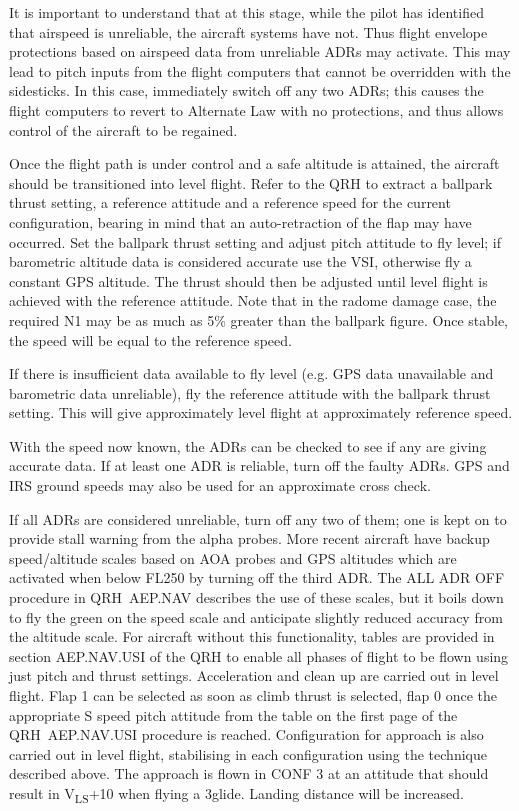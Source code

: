 \documentclass[a5paper,11pt,twoside]{book}
\newcommand{\V}[1]{V\textsubscript{#1}}
\begin{document}
It is important to understand that at this stage, while the pilot has identified
that airspeed is unreliable, the aircraft systems have not. Thus flight envelope
protections based on airspeed data from unreliable ADRs may activate. This may
lead to pitch inputs from the flight computers that cannot be overridden with
the sidesticks. In this case, immediately switch off any two ADRs; this causes
the flight computers to revert to Alternate Law with no protections, and thus
allows control of the aircraft to be regained.

Once the flight path is under control and a safe altitude is attained, the
aircraft should be transitioned into level flight. Refer to the QRH to
extract a ballpark thrust setting, a reference attitude and a reference speed
for the current configuration, bearing in mind that an auto-retraction of the
flap may have occurred. Set the ballpark thrust setting and adjust pitch
attitude to fly level; if barometric altitude data is considered accurate use
the VSI, otherwise fly a constant GPS altitude. The thrust should then be
adjusted until level flight is achieved with the reference attitude. Note that
in the radome damage case, the required N1 may be as much as 5\% greater than
the ballpark figure. Once stable, the speed will be equal to the reference
speed.

If there is insufficient data available to fly level (e.g. GPS data unavailable
and barometric data unreliable), fly the reference attitude with the ballpark
thrust setting. This will give approximately level flight at approximately
reference speed.

With the speed now known, the ADRs can be checked to see if any are giving
accurate data. If at least one ADR is reliable, turn off the faulty ADRs. GPS
and IRS ground speeds may also be used for an approximate cross check.

If all ADRs are considered unreliable, turn off any two of them; one is kept on
to provide stall warning from the alpha probes. More recent aircraft have backup
speed/altitude scales based on AOA probes and GPS altitudes which are activated
when below FL250 by turning off the third ADR. The ALL ADR OFF procedure in
QRH~AEP.NAV describes the use of these scales, but it boils down to fly the
green on the speed scale and anticipate slightly reduced accuracy from the
altitude scale.  For aircraft without this functionality, tables are provided in
section AEP.NAV.USI of the QRH to enable all phases of flight to be flown using
just pitch and thrust settings. Acceleration and clean up are carried out in
level flight. Flap 1 can be selected as soon as climb thrust is selected, flap 0
once the appropriate S speed pitch attitude from the table on the first page of
the QRH~AEP.NAV.USI procedure is reached. Configuration for approach is also
carried out in level flight, stabilising in each configuration using the
technique described above. The approach is flown in CONF 3 at an attitude that
should result in \V{LS}+10 when flying a 3\textdegree{ }glide. Landing distance
will be increased.
\end{document}
